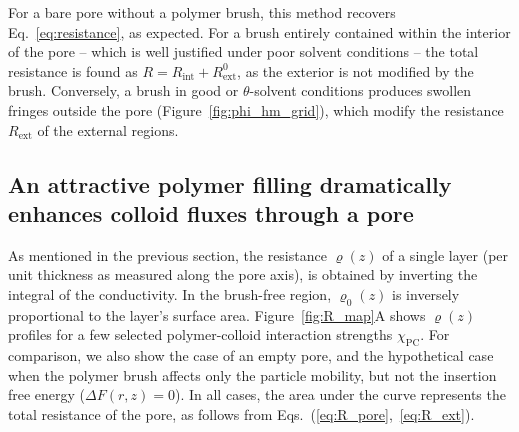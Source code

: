 \documentclass[12pt, a4paper]{article}
\begin{document}
For a bare pore without a polymer brush, this method recovers Eq.~\ref{eq:resistance}, as expected.
For a brush entirely contained within the interior of the pore -- which is well justified under poor solvent conditions -- the total resistance is found as $R = R_{\text{int}} + R_{\text{ext}}^{0}$, as the exterior is not modified by the brush.
Conversely, a brush in good or $\theta$-solvent conditions produces swollen fringes outside the pore (Figure~\ref{fig:phi_hm_grid}), which modify the resistance $R_{\text{ext}}$ of the external regions.




\subsection{An attractive polymer filling dramatically enhances colloid fluxes through a pore}

As mentioned in the previous section, the resistance $\varrho(z)$ of a single layer (per unit thickness as measured along the pore axis), is obtained by inverting the integral of the conductivity.
In the brush-free region, $\varrho_{0}(z)$ is inversely proportional to the layer's surface area.
Figure~\ref{fig:R_map}A shows $\varrho(z)$ profiles for a few selected polymer-colloid interaction strengths $\chi_{\text{PC}}$.
For comparison, we also show the case of an empty pore, and the hypothetical case when the polymer brush affects only the particle mobility, but not the insertion free energy ($\Delta F(r,z) = 0$).
In all cases, the area under the curve represents the total resistance of the pore, as follows from Eqs.~(\ref{eq:R_pore},~\ref{eq:R_ext}).
\end{document}
